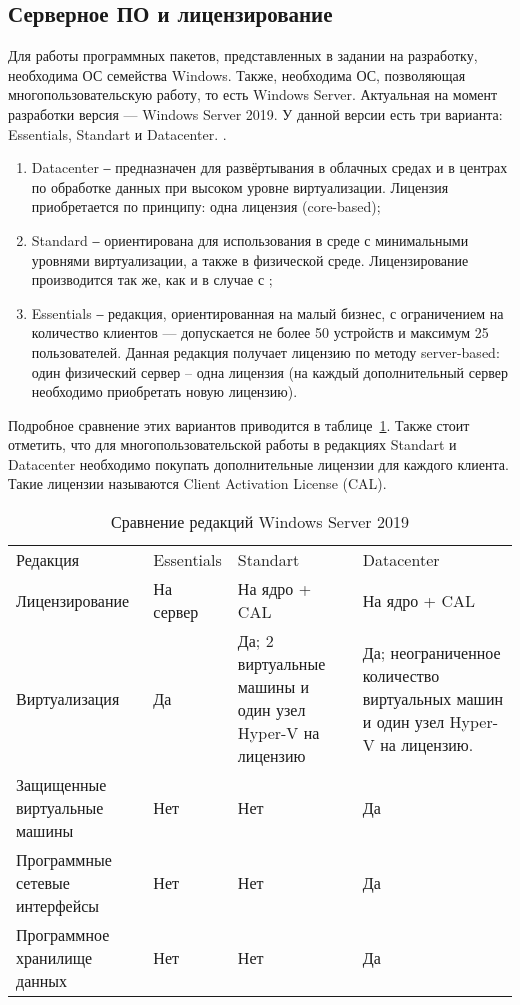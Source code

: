 \subsection{Серверное ПО и лицензирование}

Для работы программных пакетов, представленных в задании на разработку, необходима ОС
семейства Windows. Также, необходима ОС, позволяющая многопользовательскую работу, то
есть Windows Server. Актуальная на момент разработки версия — Windows Server 2019. У
данной версии есть три варианта: Essentials, Standart и Datacenter.
\cite{ref:win_srv_comp}\cite{ref:win_srv_overview}.

\begin{enumerate}
    \item Datacenter ‒ предназначен для развёртывания в облачных средах и в центрах по
        обработке данных при высоком уровне виртуализации. Лицензия приобретается по
        принципу: одна лицензия  (core-based);
    \item Standard ‒ ориентирована для использования в среде с минимальными уровнями
        виртуализации, а также в физической среде. Лицензирование производится так же,
        как и в случае с ;
    \item Essentials ‒ редакция, ориентированная на малый бизнес, с ограничением на
        количество клиентов — допускается не более 50 устройств и максимум 25
        пользователей. Данная редакция получает лицензию по методу server-based:
        один физический сервер – одна лицензия (на каждый дополнительный сервер
        необходимо приобретать новую лицензию).
\end{enumerate}

Подробное сравнение этих вариантов приводится в таблице~\ref{tab:win_srv_comp}.
Также стоит отметить, что для многопользовательской работы в редакциях Standart и
Datacenter необходимо покупать дополнительные лицензии для каждого клиента. Такие
лицензии называются Client Activation License (CAL).

\begin{table}[h]
    \centering
    \caption{Сравнение редакций Windows Server 2019}
    \label{tab:win_srv_comp}
    \begin{tabularx}{\linewidth}{XXXX}
        \toprule
        Редакция & Essentials & Standart & Datacenter \\
        Лицензирование & На сервер & На ядро + CAL & На ядро + CAL \\
        Виртуализация & Да & Да; 2 виртуальные
        машины и один узел Hyper-V на лицензию & Да; неограниченное количество
        виртуальных машин и один узел Hyper-V на лицензию. \\
        Защищенные виртуальные машины & Нет & Нет & Да \\
        Программные сетевые интерфейсы & Нет & Нет & Да \\
        Программное хранилище данных & Нет & Нет & Да \\
        \bottomrule
    \end{tabularx}
\end{table}

